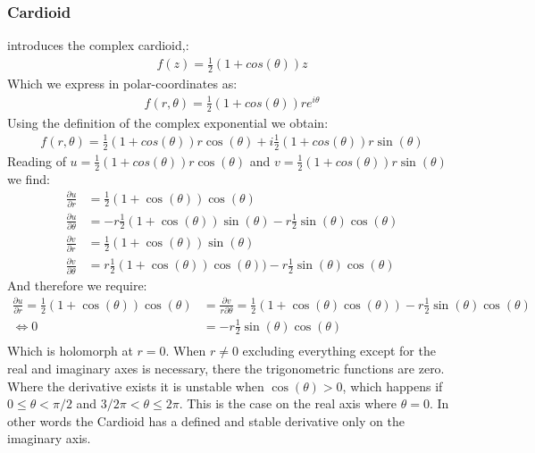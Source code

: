 \documentclass{article}
\begin{document}
\subsubsection{Cardioid}
\cite{Virtue} introduces the complex cardioid,:
\begin{align}
f(z) = \frac{1}{2}(1 + cos(\theta))z
\end{align}
Which we express in polar-coordinates as:
\begin{align}
f(r, \theta) = \frac{1}{2}(1 + cos(\theta))re^{i\theta}
\end{align}
Using the definition of the complex exponential we obtain:
\begin{align}
f(r, \theta) = \frac{1}{2}(1 + cos(\theta))r\cos(\theta) + i\frac{1}{2}(1 + cos(\theta))r\sin(\theta) 
\end{align}
Reading of $u = \frac{1}{2}(1 + cos(\theta))r\cos(\theta)$ and $v = \frac{1}{2}(1 + cos(\theta))r\sin(\theta)$ we find:
\begin{align}
\frac{\partial u}{\partial r} &= \frac{1}{2}(1 + \cos(\theta))\cos(\theta) \\
\frac{\partial u}{\partial \theta} &= -r\frac{1}{2}(1 + \cos(\theta))\sin(\theta) - r\frac{1}{2}\sin(\theta)\cos(\theta) \\
\frac{\partial v}{\partial r} &= \frac{1}{2}(1 + \cos(\theta))\sin(\theta) \\
\frac{\partial v}{\partial \theta} &= r\frac{1}{2}(1 + \cos(\theta))\cos(\theta)) - r\frac{1}{2}\sin(\theta)\cos(\theta)
\end{align}
And therefore we require:
\begin{align}
\frac{\partial u}{\partial r} = \frac{1}{2}(1 + \cos(\theta))\cos(\theta) &= \frac{\partial v}{r\partial \theta} =  \frac{1}{2}(1 + \cos(\theta)\cos(\theta)) - r\frac{1}{2}\sin(\theta)\cos(\theta) \\
\Leftrightarrow 0  &= - r\frac{1}{2}\sin(\theta)\cos(\theta) \\
\end{align}
Which is holomorph at $r=0$. When $r \neq 0$ excluding everything except for the real and imaginary axes is necessary, there the trigonometric functions are zero. Where the derivative exists it is unstable when $\cos(\theta) > 0$, which happens if $0 \leq \theta < \pi/2$ and $3/2\pi < \theta \leq 2\pi$. This is the case on the real axis where $\theta = 0$. In other words the Cardioid has a defined and stable derivative only on the imaginary axis.
\end{document}
